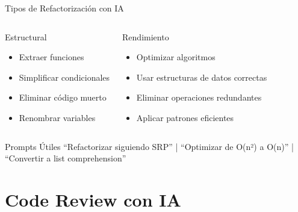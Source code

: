 \documentclass[aspectratio=169]{beamer}
\begin{document}
\begin{frame}{Tipos de Refactorización con IA}
    \begin{columns}[t]
        \begin{block}{Estructural}
            \begin{itemize}
                \item Extraer funciones
                \item Simplificar condicionales
                \item Eliminar código muerto
                \item Renombrar variables
            \end{itemize}
        \end{block}
        
        \begin{block}{Rendimiento}
            \begin{itemize}
                \item Optimizar algoritmos
                \item Usar estructuras de datos correctas
                \item Eliminar operaciones redundantes
                \item Aplicar patrones eficientes
            \end{itemize}
        \end{block}
    \end{columns}
    
    \vspace{0.5cm}
    \begin{exampleblock}{Prompts Útiles}
        ``Refactorizar siguiendo SRP'' | ``Optimizar de O(n²) a O(n)'' | ``Convertir a list comprehension''
    \end{exampleblock}
\end{frame}

\section{Code Review con IA}
\end{document}
